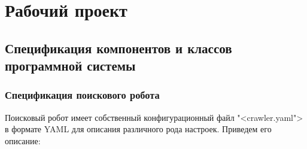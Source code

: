 \section{Рабочий проект}

\subsection{Спецификация компонентов и классов программной системы}


\subsubsection{Спецификация поискового робота}

Поисковый робот имеет собственный конфигурационный файл "<crawler.yaml"> в формате YAML для описания различного рода настроек. Приведем его описание:
